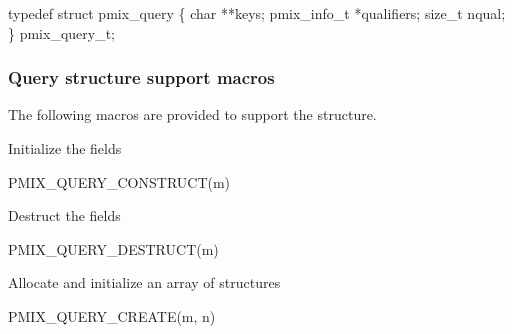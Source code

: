 \cspecificstart
\begin{codepar}
typedef struct pmix_query \{
    char **keys;
    pmix_info_t *qualifiers;
    size_t nqual;
\} pmix_query_t;
\end{codepar}
\cspecificend

\subsubsection{Query structure support macros}
The following macros are provided to support the  structure.


Initialize the  fields

\cspecificstart
\begin{codepar}
PMIX_QUERY_CONSTRUCT(m)
\end{codepar}
\cspecificend

\begin{arglist}
\end{arglist}


Destruct the  fields

\cspecificstart
\begin{codepar}
PMIX_QUERY_DESTRUCT(m)
\end{codepar}
\cspecificend

\begin{arglist}
\end{arglist}


Allocate and initialize an array of  structures

\cspecificstart
\begin{codepar}
PMIX_QUERY_CREATE(m, n)
\end{codepar}
\cspecificend

\begin{arglist}
\end{arglist}


